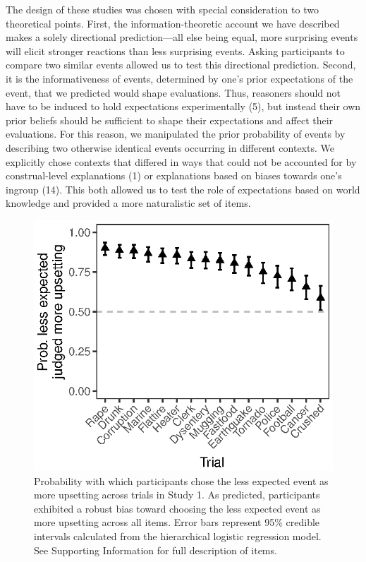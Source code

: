 \documentclass[9pt,twocolumn,twoside,]{pnas-new}
\begin{document}
The design of these studies was chosen with special consideration to two
theoretical points. First, the information-theoretic account we have
described makes a solely directional prediction---all else being equal,
more surprising events will elicit stronger reactions than less
surprising events. Asking participants to compare two similar events
allowed us to test this directional prediction. Second, it is the
informativeness of events, determined by one's prior expectations of the
event, that we predicted would shape evaluations. Thus, reasoners should
not have to be induced to hold expectations experimentally (5), but
instead their own prior beliefs should be sufficient to shape their
expectations and affect their evaluations. For this reason, we
manipulated the prior probability of events by describing two otherwise
identical events occurring in different contexts. We explicitly chose
contexts that differed in ways that could not be accounted for by
construal-level explanations (1) or explanations based on biases towards
one's ingroup (14). This both allowed us to test the role of
expectations based on world knowledge and provided a more naturalistic
set of items.

\begin{figure}
\centering
\includegraphics{fig1.eps}
\caption{Probability with which participants chose the less expected
event as more upsetting across trials in Study 1. As predicted,
participants exhibited a robust bias toward choosing the less expected
event as more upsetting across all items. Error bars represent 95\%
credible intervals calculated from the hierarchical logistic regression
model. See Supporting Information for full description of items. {}}
\end{figure}
\end{document}
